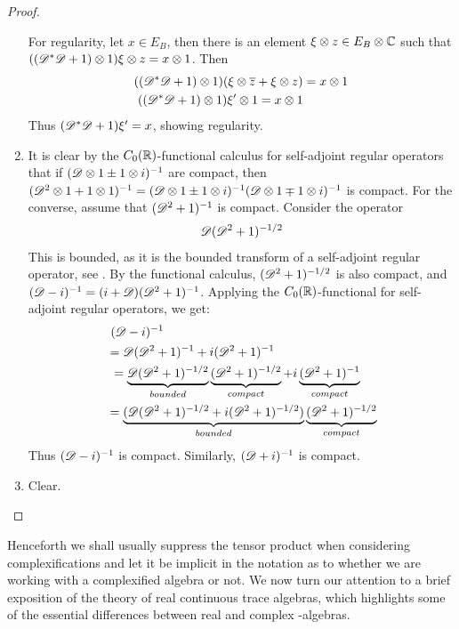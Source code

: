 \begin{proof}
\begin{enumerate}
		For regularity, let $x\in E_B$, then there is an element $\xi\otimes z \in E_{B}\otimes \mathbb{C}$ such that $((\mathscr{D}^*\mathscr{D} +1)\otimes 1) \xi\otimes z=x\otimes 1$. Then 
		\begin{align*}
			((\mathscr{D}^*\mathscr{D} +1)\otimes 1) (\xi \otimes \overline{z}+\xi \otimes z)&=x\otimes 1 \\
			((\mathscr{D}^*\mathscr{D}+1) \otimes 1) \xi' \otimes 1= x\otimes 1
		\end{align*}
		Thus $(\mathscr{D}^*\mathscr{D}+1)\xi'=x$, showing regularity.
	\item
		It is clear by the $C_0(\mathbb{R})$-functional calculus for self-adjoint regular operators that if $(\mathscr{D}\otimes 1\pm 1\otimes i)^{-1}$ are compact, then $(\mathscr{D}^2\otimes 1+1\otimes 1)^{-1}=(\mathscr{D}\otimes 1\pm 1\otimes i)^{-1}(\mathscr{D}\otimes 1\mp 1\otimes i)^{-1}$ is compact. For the converse, assume that $(\mathscr{D}^2+1)^{-1}$ is compact. Consider the operator 
		\begin{align*}
			\mathscr{D}(\mathscr{D}^2+1)^{-1/2}
		\end{align*}
		This is bounded, as it is the bounded transform of a self-adjoint regular operator, see \cite[Chapter 9]{lance95}. 
		By the functional calculus, $(\mathscr{D}^2+1)^{-1/2}$ is also compact, and $(\mathscr{D}-i)^{-1}=(i+\mathscr{D})(\mathscr{D}^2+1)^{-1}$. Applying the $C_0(\mathbb{R})$-functional for self-adjoint regular operators, we get:
		\begin{align*}
		&~(\mathscr{D}-i)^{-1} \\
		&=\mathscr{D}(\mathscr{D}^2+1)^{-1}+i(\mathscr{D}^2+1)^{-1} \\
		&~=\underbrace{\mathscr{D}(\mathscr{D}^2+1)^{-1/2}}_{bounded}\underbrace{(\mathscr{D}^2+1)^{-1/2}}_{compact}+i\underbrace{(\mathscr{D}^2+1)^{-1}}_{compact} \\
		&=\underbrace{(\mathscr{D}(\mathscr{D}^2+1)^{-1/2}+i(\mathscr{D}^2+1)^{-1/2})}_{bounded}\underbrace{(\mathscr{D}^2+1)^{-1/2}}_{compact} 
		\end{align*}
		Thus $(\mathscr{D}-i)^{-1}$ is compact. Similarly, $(\mathscr{D}+i)^{-1}$ is compact. 
	\item
		Clear.
	\end{enumerate}
\end{proof}
Henceforth we shall usually suppress the tensor product when considering complexifications and let it be implicit in the notation as to whether we are working with a complexified algebra or not. 
 We now turn our attention to a brief exposition of the theory of real continuous trace algebras, which highlights some of the essential differences between real and complex \Cstar-algebras. 
